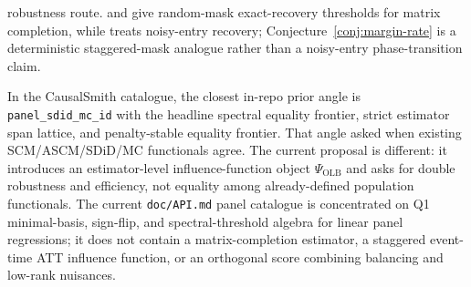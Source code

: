 \documentclass[11pt]{article}
\theoremstyle{definition}
\theoremstyle{plain}
\theoremstyle{remark}
\begin{document}
robustness route.  \citet[Theorem 1.2]{CandesTao2010} and \citet[Theorem 1.1]{KeshavanMontanariOhFew2010} give random-mask exact-recovery thresholds for matrix completion, while \citet{KeshavanMontanariOhNoisy2010} treats noisy-entry recovery; Conjecture~\ref{conj:margin-rate} is a deterministic staggered-mask analogue rather than a noisy-entry phase-transition claim.

In the CausalSmith catalogue, the closest in-repo prior angle is \texttt{panel\_sdid\_mc\_id} with the headline spectral equality frontier, strict estimator span lattice, and penalty-stable equality frontier.  That angle asked when existing SCM/ASCM/SDiD/MC functionals agree.  The current proposal is different: it introduces an estimator-level influence-function object \(\Psi_{\mathrm{OLB}}\) and asks for double robustness and efficiency, not equality among already-defined population functionals.  The current \texttt{doc/API.md} panel catalogue is concentrated on Q1 minimal-basis, sign-flip, and spectral-threshold algebra for linear panel regressions; it does not contain a matrix-completion estimator, a staggered event-time ATT influence function, or an orthogonal score combining balancing and low-rank nuisances.
\end{document}
